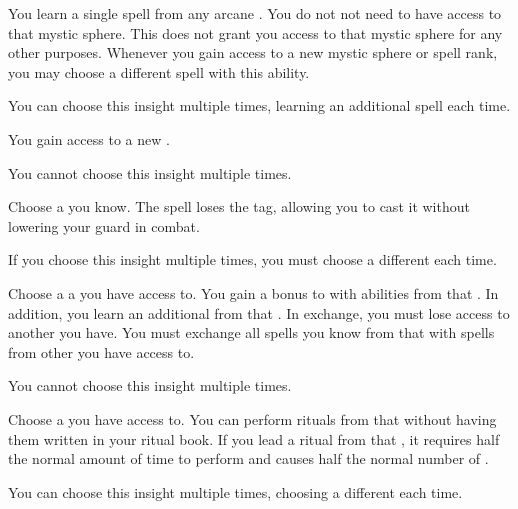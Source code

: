         {
             You learn a single spell from any arcane .
            You do not not need to have access to that mystic sphere.
            This does not grant you access to that mystic sphere for any other purposes.
            Whenever you gain access to a new mystic sphere or spell rank, you may choose a different spell with this ability.
            \par You can choose this insight multiple times, learning an additional spell each time.

             You gain access to a new .
            \par You cannot choose this insight multiple times.

             Choose a  you know.
            The spell loses the  tag, allowing you to cast it without lowering your guard in combat.
            \par If you choose this insight multiple times, you must choose a different  each time.

             Choose a a  you have access to.
            You gain a  bonus to  with abilities from that .
            In addition, you learn an additional  from that .
            In exchange, you must lose access to another  you have.
            You must exchange all spells you know from that  with spells from other  you have access to.
            \par You cannot choose this insight multiple times.

            Choose a  you have access to.
            You can perform rituals from that  without having them written in your ritual book.
            If you lead a ritual from that , it requires half the normal amount of time to perform and causes half the normal number of .
            \par You can choose this insight multiple times, choosing a different  each time.
        }

